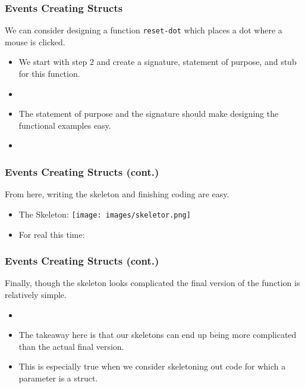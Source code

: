 \documentclass{beamer}
\begin{document}
\begin{frame}
  \frametitle{Events Creating Structs}
  We can consider designing a function \texttt{reset-dot}
  which places a dot where a mouse is clicked.
  \begin{itemize}
  \item<2-> We start with step 2 and create a signature, statement of
    purpose, and stub for this function.
  \item<3-> \ResetDotHeader
  \item<4-> The statement of purpose and the signature should make
    designing the functional examples easy.
  \item<5-> \ResetDotExamples
  \end{itemize}
\end{frame}

\begin{frame}
  \frametitle{Events Creating Structs (cont.)}
  From here, writing the skeleton and finishing coding are easy.
  \begin{itemize}
  \item<2-> The Skeleton:    
    \texttt{[image: images/skeletor.png]}
  \item<3-> For real this time:    \ResetDotSkeleton
  \end{itemize}
\end{frame}

\begin{frame}
  \frametitle{Events Creating Structs (cont.)}
      Finally, though the skeleton looks complicated the final version
    of the function is relatively simple.
  \begin{itemize}
  \item<2-> \ResetDotFinal
  \item<3-> The takeaway here is that our skeletons can end up being
    more complicated than the actual final version.
  \item<4-> This is especially true when we consider skeletoning
    out code for which a parameter is a struct.
  \end{itemize}
\end{frame}

\end{document}
